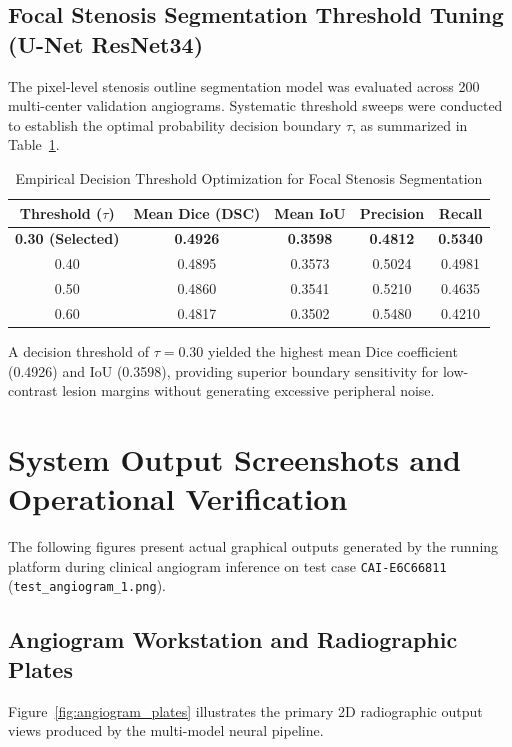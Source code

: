 \subsection{Focal Stenosis Segmentation Threshold Tuning (U-Net ResNet34)}
The pixel-level stenosis outline segmentation model was evaluated across 200 multi-center validation angiograms. Systematic threshold sweeps were conducted to establish the optimal probability decision boundary $\tau$, as summarized in Table~\ref{tab:threshold_tuning}.

\begin{table}[H]
\centering
\caption{Empirical Decision Threshold Optimization for Focal Stenosis Segmentation}
\label{tab:threshold_tuning}
\begin{tabular}{ccccc}
\toprule
\textbf{Threshold ($\tau$)} & \textbf{Mean Dice (DSC)} & \textbf{Mean IoU} & \textbf{Precision} & \textbf{Recall} \\
\midrule
\textbf{0.30 (Selected)} & \textbf{0.4926} & \textbf{0.3598} & \textbf{0.4812} & \textbf{0.5340} \\
0.40 & 0.4895 & 0.3573 & 0.5024 & 0.4981 \\
0.50 & 0.4860 & 0.3541 & 0.5210 & 0.4635 \\
0.60 & 0.4817 & 0.3502 & 0.5480 & 0.4210 \\
\bottomrule
\end{tabular}
\end{table}

A decision threshold of $\tau = 0.30$ yielded the highest mean Dice coefficient (0.4926) and IoU (0.3598), providing superior boundary sensitivity for low-contrast lesion margins without generating excessive peripheral noise.

\section{System Output Screenshots and Operational Verification}
The following figures present actual graphical outputs generated by the running platform during clinical angiogram inference on test case \texttt{CAI-E6C66811} (\texttt{test\_angiogram\_1.png}).

\subsection{Angiogram Workstation and Radiographic Plates}
Figure~\ref{fig:angiogram_plates} illustrates the primary 2D radiographic output views produced by the multi-model neural pipeline.

